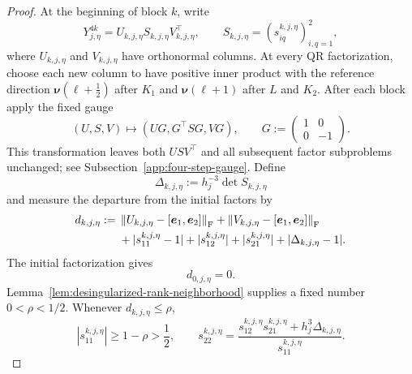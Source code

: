 \documentclass[]{article}
\numberwithin{equation}{section}
\theoremstyle{plain}
\theoremstyle{remark}
\newcommand{\F}{\mathrm F}
\newcommand{\norm}[1]{\left\lVert #1\right\rVert}
\begin{document}
\begin{proof}
At the beginning of block $k$, write
\begin{equation}\label{eq:block-factorization}
 Y_{j,\eta}^{4k}=U_{k,j,\eta}S_{k,j,\eta}V_{k,j,\eta}^{\top},
 \qquad
 S_{k,j,\eta}=(s_{iq}^{k,j,\eta})_{i,q=1}^2,
\end{equation}
where $U_{k,j,\eta}$ and $V_{k,j,\eta}$ have orthonormal columns.
At every QR factorization, choose each new column to have positive
inner product with the reference direction
$\boldsymbol\nu(\ell+\tfrac12)$ after $K_1$ and
$\boldsymbol\nu(\ell+1)$ after $L$ and $K_2$.  After each block
apply the fixed gauge
\begin{equation}\label{eq:block-gauge-main}
 (U,S,V)\longmapsto(UG,G^\top SG,VG),
 \qquad G:=\begin{pmatrix}1&0\\0&-1\end{pmatrix}.
\end{equation}
This transformation leaves both $USV^\top$ and all subsequent factor
subproblems unchanged; see Subsection~\ref{app:four-step-gauge}.
Define
\begin{equation}\label{eq:block-core-determinant}
 \Delta_{k,j,\eta}:=h_j^{-3}\det S_{k,j,\eta}
\end{equation}
and measure the departure from the initial factors by
\begin{align}
 d_{k,j,\eta}:={}&
 \norm{U_{k,j,\eta}-[\boldsymbol e_1,\boldsymbol e_2]}_{\F}
 +\norm{V_{k,j,\eta}-[\boldsymbol e_1,\boldsymbol e_2]}_{\F}
 \notag\\
 &+|s_{11}^{k,j,\eta}-1|+|s_{12}^{k,j,\eta}|
 +|s_{21}^{k,j,\eta}|+|\Delta_{k,j,\eta}-1|.
 \label{eq:block-factor-distance}
\end{align}
The initial factorization gives
\begin{equation}\label{eq:block-factor-distance-initial}
 d_{0,j,\eta}=0.
\end{equation}
Lemma~\ref{lem:desingularized-rank-neighborhood} supplies a fixed number
\(0<\rho<1/2\).  Whenever \(d_{k,j,\eta}\le\rho\),
\begin{equation}\label{eq:block-core-chart}
 |s_{11}^{k,j,\eta}|\ge1-\rho>\frac12,
 \qquad
 s_{22}^{k,j,\eta}
 =\frac{s_{12}^{k,j,\eta}s_{21}^{k,j,\eta}
       +h_j^3\Delta_{k,j,\eta}}{s_{11}^{k,j,\eta}}.
\end{equation}


\end{proof}
\end{document}
